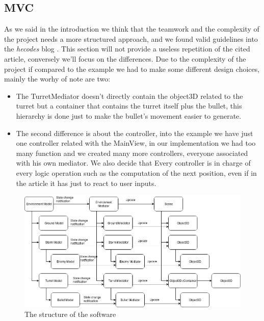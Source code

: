 \subsection{MVC}
As we said in the introduction we think that the teamwork and the complexity of the project needs a more structured approach, and we found valid guidelines into the \textit{hecodes} blog \cite{mvcarticle}. This section will not provide a useless repetition of the cited article, conversely we'll focus on the differences. 
Due to the complexity of the project if compared to the example we had to make some different design choices, mainly the worhy of note are two:
\begin{itemize}
\item The TurretMediator doesn't directly contain the object3D related to the turret but a container that contains the turret itself plus the bullet, this hierarchy is done just to make the bullet's movement easier to generate.
\item The second difference is about the controller, into the example we have just one controller related with the MainView, in our implementation we had too many function and we created many more controllers, everyone associated with his own mediator. We also decide that Every controller is in charge of every logic operation such as the computation of the next position, even if in the article it has just to react to user inputs.
\end{itemize}
\begin{figure}[h!]
\begin{center}
\includegraphics[scale=0.5]{images/MVC.png}
\caption{The structure of the software}
\end{center}
\end{figure}
